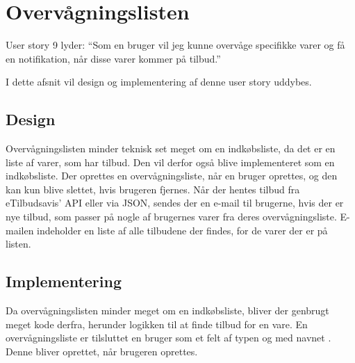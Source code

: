 \section{Overvågningslisten}

User story 9 lyder: ``Som en bruger vil jeg kunne overvåge specifikke varer og få en notifikation, når disse varer kommer på tilbud.''

I dette afsnit vil design og implementering af denne user story uddybes.

\subsection{Design}
Overvågningslisten minder teknisk set meget om en indkøbsliste, da det er en liste af varer, som har tilbud.
Den vil derfor også blive implementeret som en indkøbsliste. 
Der oprettes en overvågningsliste, når en bruger oprettes, og den kan kun blive slettet, hvis brugeren fjernes.
Når der hentes tilbud fra eTilbudsavis' API eller via JSON, sendes der en e-mail til brugerne, hvis der er nye tilbud, som passer på nogle af brugernes varer fra deres overvågningsliste. 
E-mailen indeholder en liste af alle tilbudene der findes, for de varer der er på listen.

\subsection{Implementering} 
Da overvågningslisten minder meget om en indkøbsliste, bliver der genbrugt meget kode derfra, herunder logikken til at finde tilbud for en vare. 
En overvågningsliste er tilsluttet en bruger som et felt af typen  og med navnet . 
Denne  bliver oprettet, når brugeren oprettes.

